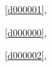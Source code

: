 ﻿



\noindent\treeindexnumbernameone\ \ref{d000001},\ \pageref{d000001}%

\noindent\treeindexnumbernameone\ \ref{d000000},\ \pageref{d000000}%

\noindent\treeindexnumbernameone\ \ref{d000002},\ \pageref{d000002}%









